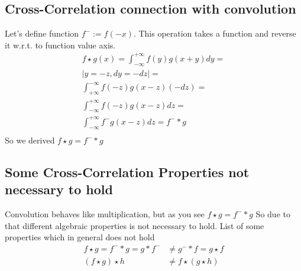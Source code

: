 \documentclass[12pt,a4paper]{article}
\theoremstyle{plain}
\begin{document}
\subsection{Cross-Correlation connection with convolution}
Let’s define function $f^{-}:=f(-x)$. This operation takes a function and reverse it w.r.t. to function value axis.
\begin{multline}
f \star g(x)=\int^{+\infty}_{-\infty} f(y)g(x+y)dy=\\
|y=-z,dy=-dz|=\\
\int^{-\infty}_{+\infty} f(-z)g(x-z)(-dz)=\\
\int^{+\infty}_{-\infty} f(-z)g(x-z)dz=\\
\int^{+\infty}_{-\infty} f^{-}g(x-z)dz=f^{-}*g\\
\end{multline}
So we derived $f \star g=f^{-}*g$
\subsection{Some Cross-Correlation Properties not necessary to hold}
Convolution behaves like multiplication, but as you see $f \star g=f^{-}*g$
So due to that different algebraic properties is not necessary to hold.
List of some properties which in general does not hold
\begin{align}
f \star g =f^-*g = g*f^- &\ne g^-*f= g \star f\\
(f \star g) \star h &\ne f \star (g \star h)
\end{align}
\end{document}
